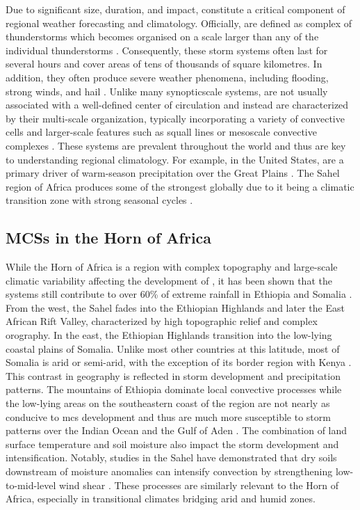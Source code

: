 Due to significant size, duration, and impact,  constitute a critical component of regional weather forecasting and climatology. Officially,  are defined as complex of thunderstorms which becomes organised on a scale larger than any of the individual thunderstorms \citep{NOAANWS2025}. Consequently, these storm systems often last for several hours and cover areas of tens of thousands of square kilometres. In addition, they often produce severe weather phenomena, including flooding, strong winds, and hail \citep{Houze2014}. Unlike many \Gls{synopticscale} systems,  are not usually associated with a well-defined center of circulation and instead are characterized by their multi-scale organization, typically incorporating a variety of convective cells and larger-scale features such as squall lines or mesoscale convective complexes \citep{NOAANWS2025,AMS2024}. These systems are prevalent throughout the world and thus are key to understanding regional climatology. For example, in the United States,  are a primary driver of warm-season precipitation over the Great Plains \citep{Haberlie2019}. The Sahel region of Africa produces some of the strongest  globally due to it being a climatic transition zone with strong seasonal cycles \citep{Zipser2006}.

\subsection{MCSs in the Horn of Africa}

While the Horn of Africa is a region with complex topography and large-scale climatic variability affecting the development of , it has been shown that the systems still contribute to over 60\% of extreme rainfall in Ethiopia and Somalia \citep{Hill2023}. From the west, the Sahel fades into the Ethiopian Highlands and later the East African Rift Valley, characterized by high topographic relief and complex orography. In the east, the Ethiopian Highlands transition into the low-lying coastal plains of Somalia. Unlike most other countries at this latitude, most of Somalia is arid or semi-arid, with the exception of its border region with Kenya \citep{Beck2023}. This contrast in geography is reflected in storm development and precipitation patterns. The mountains of Ethiopia dominate local convective processes \citep{Negash2024} while the low-lying areas on the southeastern coast of the region are not nearly as conducive to \acrshort{mcs} development and thus are much more susceptible to storm patterns over the Indian Ocean and the Gulf of Aden \citep{Camberlin2024}. The combination of land surface temperature and soil moisture also impact the storm development and intensification. Notably, studies in the Sahel have demonstrated that dry soils downstream of moisture anomalies can intensify convection by strengthening low-to-mid-level wind shear \citep{Klein2020,Taylor2017}. These processes are similarly relevant to the Horn of Africa, especially in transitional climates bridging arid and humid zones.

